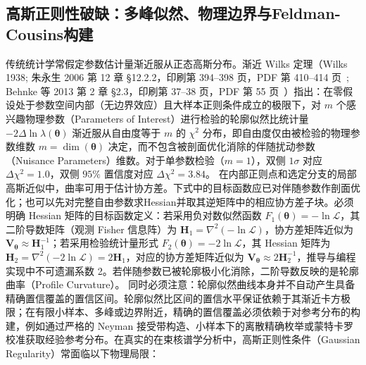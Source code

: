 \subsection{高斯正则性破缺：多峰似然、物理边界与Feldman-Cousins构建}\label{subsec:5-10-3}

传统统计学常假定参数估计量渐近服从正态高斯分布。渐近 Wilks 定理（Wilks 1938; 朱永生 2006 第 12 章 §12.2.2，印刷第 394--398 页，PDF 第 410--414 页~\cite{book-zhu-probability-statistics-in-physics}; Behnke 等 2013 第 2 章 §2.3，印刷第 37--38 页，PDF 第 55 页~\cite{book-behnke-data-analysis-hep}）指出：在零假设处于参数空间内部（无边界效应）且大样本正则条件成立的极限下，对 $m$ 个感兴趣物理参数（Parameters of Interest）进行检验的轮廓似然比统计量 $-2\Delta\ln\lambda(\boldsymbol{\theta})$ 渐近服从自由度等于 $m$ 的 $\chi^2$ 分布，即自由度仅由被检验的物理参数维数 $m = \dim(\boldsymbol{\theta})$ 决定，而不包含被剖面优化消除的伴随扰动参数（Nuisance Parameters）维数。对于单参数检验（$m=1$），双侧 $1\sigma$ 对应 $\Delta\chi^2 = 1.0$，双侧 $95\%$ 置信度对应 $\Delta\chi^2 = 3.84$。
在内部正则点和选定分支的局部高斯近似中，曲率可用于估计协方差。下式中的目标函数应已对伴随参数作剖面优化；也可以先对完整自由参数求Hessian并取其逆矩阵中的相应协方差子块。必须明确 Hessian 矩阵的目标函数定义：若采用负对数似然函数 $F_1(\boldsymbol{\theta}) = -\ln\mathcal{L}$，其二阶导数矩阵（观测 Fisher 信息阵）为 $\mathbf{H}_1 = \nabla^2(-\ln\mathcal{L})$，协方差矩阵近似为 $\mathbf{V}_{\boldsymbol{\theta}} \approx \mathbf{H}_1^{-1}$；若采用检验统计量形式 $F_2(\boldsymbol{\theta}) = -2\ln\mathcal{L}$，其 Hessian 矩阵为 $\mathbf{H}_2 = \nabla^2(-2\ln\mathcal{L}) = 2\mathbf{H}_1$，对应的协方差矩阵近似为 $\mathbf{V}_{\boldsymbol{\theta}} \approx 2 \mathbf{H}_2^{-1}$，推导与编程实现中不可遗漏系数 2。若伴随参数已被轮廓极小化消除，二阶导数反映的是轮廓曲率（Profile Curvature）。
同时必须注意：轮廓似然曲线本身并不自动产生具备精确置信覆盖的置信区间。轮廓似然比区间的置信水平保证依赖于其渐近卡方极限；在有限小样本、多峰或边界附近，精确的置信覆盖必须依赖于对参考分布的构建，例如通过严格的 Neyman 接受带构造、小样本下的离散精确枚举或蒙特卡罗校准获取经验参考分布。在真实的在束核谱学分析中，高斯正则性条件（Gaussian Regularity）常面临以下物理局限：
